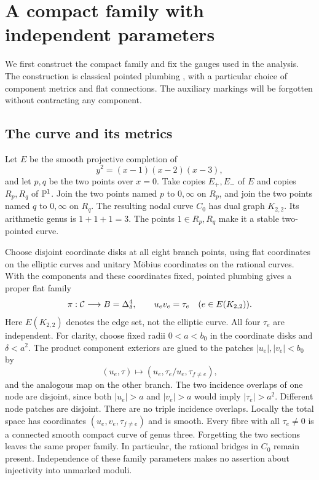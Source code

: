 \section{A compact family with independent parameters}\label{sec:geometry}

We first construct the compact family and fix the gauges used in the
analysis. The construction is classical pointed plumbing
\cite[\S8.3]{hubbard-koch}, with a particular choice of component metrics
and flat connections. The auxiliary markings will be forgotten without
contracting any component.

\subsection{The curve and its metrics}
Let $E$ be the smooth projective completion of
\[
 y^2=(x-1)(x-2)(x-3),
\]
and let $p,q$ be the two points over $x=0$. Take copies $E_+,E_-$ of
$E$ and copies $R_p,R_q$ of $\mathbb P^1$. Join the two points named $p$ to
$0,\infty$ on $R_p$, and join the two points named $q$ to $0,\infty$
on $R_q$. The resulting nodal curve $C_0$ has dual graph $K_{2,2}$.
Its arithmetic genus is $1+1+1=3$. The points $1\in R_p,R_q$ make it a
stable two-pointed curve.

Choose disjoint coordinate disks at all eight branch points, using flat
coordinates on the elliptic curves and unitary M\"obius coordinates on
the rational curves. With the components and these coordinates fixed,
pointed plumbing gives a proper flat family
\begin{equation}\label{eq:plumbing}
 \pi:\mathcal C\longrightarrow B=\Delta_\delta^4,
 \qquad u_ev_e=\tau_e\quad(e\in E(K_{2,2})).
\end{equation}
Here $E(K_{2,2})$ denotes the edge set, not the elliptic curve. All four
$\tau_e$ are independent. For clarity, choose fixed radii $0<a<b_0$
in the coordinate disks and $\delta<a^2$. The product component exteriors
are glued to the patches $|u_e|,|v_e|<b_0$ by
\[
 (u_e,\tau)\longmapsto
 (u_e,\tau_e/u_e,\tau_{f\ne e}),
\]
and the analogous map on the other branch. The two incidence overlaps of
one node are disjoint, since both $|u_e|>a$ and $|v_e|>a$ would imply
$|\tau_e|>a^2$. Different node patches are disjoint. There are no triple
incidence overlaps. Locally the total space has coordinates
$(u_e,v_e,\tau_{f\ne e})$ and is smooth. Every fibre with all
$\tau_e\ne0$ is a connected smooth compact curve of genus three.
Forgetting the two sections leaves the same proper family. In particular,
the rational bridges in $C_0$ remain present. Independence of these family
parameters makes no assertion about injectivity into unmarked moduli.

